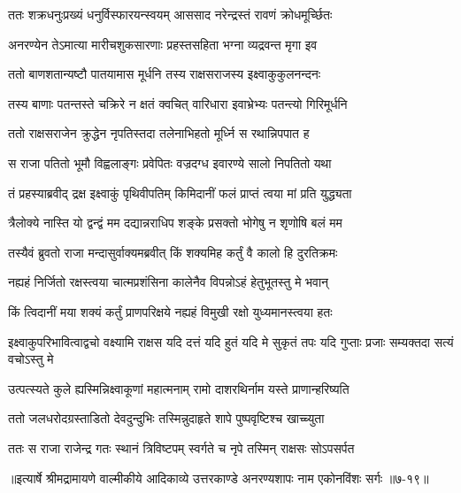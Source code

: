 \twolineshloka
{ततः शक्रधनुःप्रख्यं धनुर्विस्फारयन्स्वयम्}
{आससाद नरेन्द्रस्तं रावणं क्रोधमूर्च्छितः} %

\twolineshloka
{अनरण्येन तेऽमात्या मारीचशुकसारणाः}
{प्रहस्तसहिता भग्ना व्यद्रवन्त मृगा इव} %

\twolineshloka
{ततो बाणशतान्यष्टौ पातयामास मूर्धनि}
{तस्य राक्षसराजस्य इक्ष्वाकुकुलनन्दनः} %

\twolineshloka
{तस्य बाणाः पतन्तस्ते चक्रिरे न क्षतं क्वचित्}
{वारिधारा इवाभ्रेभ्यः पतन्त्यो गिरिमूर्धनि} %

\twolineshloka
{ततो राक्षसराजेन क्रुद्धेन नृपतिस्तदा}
{तलेनाभिहतो मूर्ध्नि स रथान्निपपात ह} %

\twolineshloka
{स राजा पतितो भूमौ विह्वलाङ्गः प्रवेपितः}
{वज्रदग्ध इवारण्ये सालो निपतितो यथा} %

\twolineshloka
{तं प्रहस्याब्रवीद् द्रक्ष इक्ष्वाकुं पृथिवीपतिम्}
{किमिदानीं फलं प्राप्तं त्वया मां प्रति युद्ध्यता} %

\twolineshloka
{त्रैलोक्ये नास्ति यो द्वन्द्वं मम दद्यान्नराधिप}
{शङ्के प्रसक्तो भोगेषु न शृणोषि बलं मम} %

\twolineshloka
{तस्यैवं ब्रुवतो राजा मन्दासुर्वाक्यमब्रवीत्}
{किं शक्यमिह कर्तुं वै कालो हि दुरतिक्रमः} %

\twolineshloka
{नह्यहं निर्जितो रक्षस्त्वया चात्मप्रशंसिना}
{कालेनैव विपन्नोऽहं हेतुभूतस्तु मे भवान्} %

\twolineshloka
{किं त्विदानीं मया शक्यं कर्तुं प्राणपरिक्षये}
{नह्यहं विमुखी रक्षो युध्यमानस्त्वया हतः} %

\twolineshloka
{इक्ष्वाकुपरिभावित्वाद्वचो वक्ष्यामि राक्षस}
{यदि दत्तं यदि हुतं यदि मे सुकृतं तपः यदि गुप्ताः प्रजाः सम्यक्तदा सत्यं वचोऽस्तु मे} %

\twolineshloka
{उत्पत्स्यते कुले ह्यस्मिन्निक्ष्वाकूणां महात्मनाम्}
{रामो दाशरथिर्नाम यस्ते प्राणान्हरिष्यति} %

\twolineshloka
{ततो जलधरोदग्रस्ताडितो देवदुन्दुभिः}
{तस्मिन्नुदाहृते शापे पुष्पवृष्टिश्च खाच्च्युता} %

\twolineshloka
{ततः स राजा राजेन्द्र गतः स्थानं त्रिविष्टपम्}
{स्वर्गते च नृपे तस्मिन् राक्षसः सोऽपसर्पत} %


॥इत्यार्षे श्रीमद्रामायणे वाल्मीकीये आदिकाव्ये उत्तरकाण्डे अनरण्यशापः नाम एकोनविंशः सर्गः ॥७-१९॥
